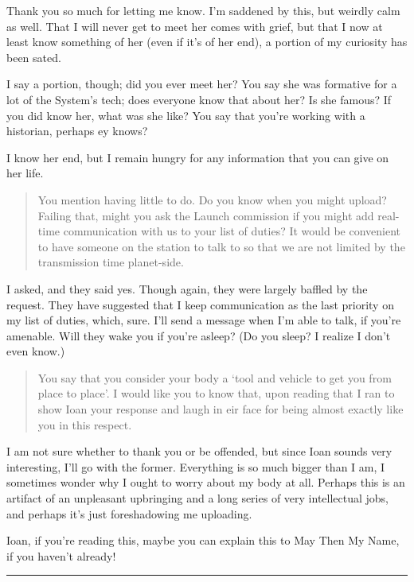 Thank you so much for letting me know. I'm saddened by this, but weirdly calm as well. That I will never get to meet her comes with grief, but that I now at least know something of her (even if it's of her end), a portion of my curiosity has been sated.

I say a portion, though; did you ever meet her? You say she was formative for a lot of the System's tech; does everyone know that about her? Is she famous? If you did know her, what was she like? You say that you're working with a historian, perhaps ey knows?

I know her end, but I remain hungry for any information that you can give on her life.

\begin{quote}
You mention having little to do. Do you know when you might upload? Failing that, might you ask the Launch commission if you might add real-time communication with us to your list of duties? It would be convenient to have someone on the station to talk to so that we are not limited by the transmission time planet-side.
\end{quote}

I asked, and they said yes. Though again, they were largely baffled by the request. They have suggested that I keep communication as the last priority on my list of duties, which, sure. I'll send a message when I'm able to talk, if you're amenable. Will they wake you if you're asleep? (Do you sleep? I realize I don't even know.)

\begin{quote}
You say that you consider your body a `tool and vehicle to get you from place to place'. I would like you to know that, upon reading that I ran to show Ioan your response and laugh in eir face for being almost exactly like you in this respect.
\end{quote}

I am not sure whether to thank you or be offended, but since Ioan sounds very interesting, I'll go with the former. Everything is so much bigger than I am, I sometimes wonder why I ought to worry about my body at all. Perhaps this is an artifact of an unpleasant upbringing and a long series of very intellectual jobs, and perhaps it's just foreshadowing me uploading.

Ioan, if you're reading this, maybe you can explain this to May Then My Name, if you haven't already!

\begin{center}\rule{0.5\linewidth}{0.5pt}\end{center}

